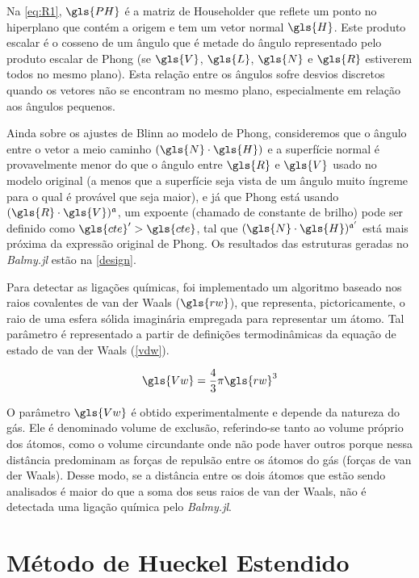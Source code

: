 Na \autoref{eq:R1}, $\gls{PH}$ é a matriz de Householder que reflete um ponto no hiperplano que contém a origem e tem um vetor normal $\gls{H}$. Este produto escalar é o cosseno de um ângulo que é metade do ângulo representado pelo produto escalar de Phong (se $\gls{V}$, $\gls{L}$, $\gls{N}$ e $\gls{R}$ estiverem todos no mesmo plano). Esta relação entre os ângulos sofre desvios discretos quando os vetores não se encontram no mesmo plano, especialmente em relação aos ângulos pequenos.

Ainda sobre os ajustes de Blinn ao modelo de Phong, consideremos que o ângulo entre o vetor a meio caminho $(\gls{N} \cdot \gls{H})$ e a superfície normal é provavelmente menor do que o ângulo entre $\gls{R}$ e $\gls{V}$ usado no modelo original (a menos que a superfície seja vista de um ângulo muito íngreme para o qual é provável que seja maior), e já que Phong está usando $(\gls{R} \cdot \gls{V})^\mathfrak{a}$, um expoente (chamado de constante de brilho) pode ser definido como $\gls{cte}' > \gls{cte}$, tal que $(\gls{N} \cdot \gls{H})^{\mathfrak{a}'}$ está mais próxima da expressão original de Phong. Os resultados das estruturas geradas no \textit{Balmy.jl} estão na \autoref{design}.

Para detectar as ligações químicas, foi implementado um algoritmo baseado nos raios covalentes de van der Waals ($\gls{rw}$), que representa, pictoricamente, o raio de uma esfera sólida imaginária empregada para representar um átomo. Tal parâmetro é representado a partir de definições termodinâmicas da equação de estado de van der Waals (\autoref{vdw})\autocite{Volodina2022}.

\begin{equation}
\label{vdw}
    \gls{Vw} = \frac{4}{3} \pi {\gls{rw}}^3
\end{equation}

O parâmetro $\gls{Vw}$ é obtido experimentalmente e depende da natureza do gás. Ele é denominado volume de exclusão, referindo-se tanto ao volume próprio dos átomos, como o volume circundante onde não pode haver outros porque nessa distância predominam as forças de repulsão entre os átomos do gás (forças de van der Waals). Desse modo, se a distância entre os dois átomos que estão sendo analisados é maior do que a soma dos seus raios de van der Waals, não é detectada uma ligação química pelo \textit{Balmy.jl}.

\section{Método de Hueckel Estendido}

